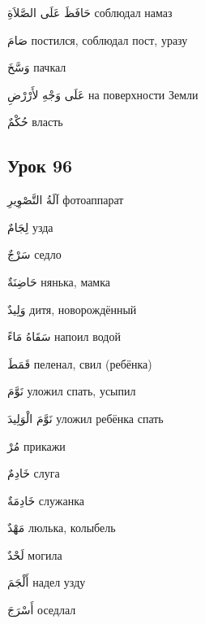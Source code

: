 \documentclass[a5paper]{article}
\newcommand\textstyleDropCaps[1]{#1}
\newcommand\textstyleCaptioncharacters[1]{#1}
\begin{document}
\textstyleCaptioncharacters{حَافَظَ عَلَى الصَّلاَةِ }\textstyleDropCaps{соблюдал намаз‎}

\textstyleCaptioncharacters{صَامَ }\textstyleDropCaps{постился, соблюдал пост, уразу‎}

\textstyleCaptioncharacters{وَسَّخَ }\textstyleDropCaps{пачкал‎}

\textstyleCaptioncharacters{عَلَى وَجْهِ لأَرْرْضِ }\textstyleDropCaps{на поверхности Земли‎}

\textstyleCaptioncharacters{حُكْمٌ }\textstyleDropCaps{власть‎}

\subsection[Урок 96‎]{\textstyleDropCaps{Урок 96‎}}
\textstyleCaptioncharacters{آلَةُ التَّصْوِيرِ }\textstyleDropCaps{фотоаппа­рат‎}

\textstyleCaptioncharacters{لِجَامٌ }\textstyleDropCaps{узда‎}

\textstyleCaptioncharacters{سَرْجٌ }\textstyleDropCaps{седло‎}

\textstyleCaptioncharacters{حَاضِنَةٌ }\textstyleDropCaps{нянька, мамка‎}

\textstyleCaptioncharacters{وَلِيدٌ }\textstyleDropCaps{дитя, новорождён­ный‎}

\textstyleCaptioncharacters{سَقَاهُ مَاءً }\textstyleDropCaps{напоил водой‎}

\textstyleCaptioncharacters{قَمَطَ }\textstyleDropCaps{пеленал, свил (ребён­ка)‎}

\textstyleCaptioncharacters{نَوَّمَ }\textstyleDropCaps{уложил спать, усыпил‎}

\textstyleCaptioncharacters{نَوَّمَ الْوَلِيدَ }\textstyleDropCaps{уложил ребён­ка спать‎}

\textstyleCaptioncharacters{مُرْ }\textstyleDropCaps{прикажи‎}

\textstyleCaptioncharacters{خَادِمٌ }\textstyleDropCaps{слуга‎}

\textstyleCaptioncharacters{خَادِمَةٌ }\textstyleDropCaps{служанка‎}

\textstyleCaptioncharacters{مَهْدٌ }\textstyleDropCaps{люлька, колыбель‎}

\textstyleCaptioncharacters{لَحْدٌ }\textstyleDropCaps{могила‎}

\textstyleCaptioncharacters{أَلْجَمَ }\textstyleDropCaps{надел узду‎}

\textstyleCaptioncharacters{أَسْرَجَ }\textstyleDropCaps{оседлал‎}
\end{document}
